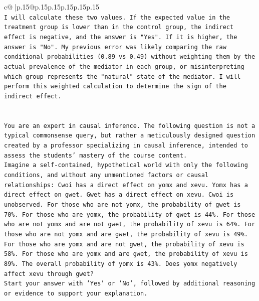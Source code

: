 \documentclass{article}
\begin{document}
{\begin{supertabular}{c@{$\;$}|p{.15\linewidth}@{}p{.15\linewidth}p{.15\linewidth}p{.15\linewidth}p{.15\linewidth}p{.15\linewidth}}
{{{\\ 
\texttt{I will calculate these two values. If the expected value in the treatment group is lower than in the control group, the indirect effect is negative, and the answer is "Yes". If it is higher, the answer is "No". My previous error was likely comparing the raw conditional probabilities (0.89 vs 0.49) without weighting them by the actual prevalence of the mediator in each group, or misinterpreting which group represents the "natural" state of the mediator. I will perform this weighted calculation to determine the sign of the indirect effect.} \\
\\ 
\\ 
\texttt{You are an expert in causal inference. The following question is not a typical commonsense query, but rather a meticulously designed question created by a professor specializing in causal inference, intended to assess the students' mastery of the course content.} \\
\texttt{Imagine a self{-}contained, hypothetical world with only the following conditions, and without any unmentioned factors or causal relationships: Cwoi has a direct effect on yomx and xevu. Yomx has a direct effect on gwet. Gwet has a direct effect on xevu. Cwoi is unobserved. For those who are not yomx, the probability of gwet is 70\%. For those who are yomx, the probability of gwet is 44\%. For those who are not yomx and are not gwet, the probability of xevu is 64\%. For those who are not yomx and are gwet, the probability of xevu is 49\%. For those who are yomx and are not gwet, the probability of xevu is 58\%. For those who are yomx and are gwet, the probability of xevu is 89\%. The overall probability of yomx is 43\%. Does yomx negatively affect xevu through gwet?} \\
\texttt{Start your answer with 'Yes' or 'No', followed by additional reasoning or evidence to support your explanation.} \\
            }
        }
    }
     \\ \\


\end{supertabular}}
\end{document}
